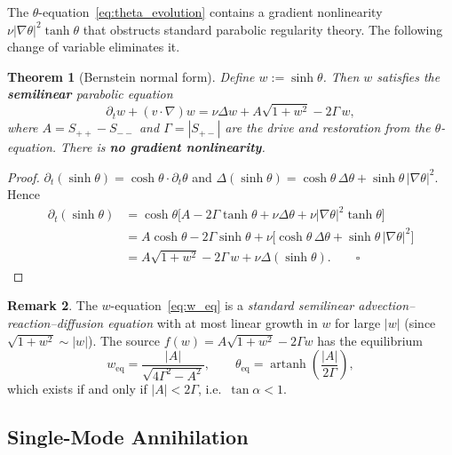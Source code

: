 \documentclass[12pt,a4paper]{article}
\newtheorem{theorem}{Theorem}[section]
\theoremstyle{definition}
\newtheorem{remark}[theorem]{Remark}
\newcommand{\artanh}{\operatorname{artanh}}
\begin{document}
The $\theta$-equation~\eqref{eq:theta_evolution} contains a gradient
nonlinearity $\nu|\nabla\theta|^2\tanh\theta$ that obstructs standard
parabolic regularity theory. The following change of variable eliminates it.

\begin{theorem}[Bernstein normal form]\label{thm:bernstein}
Define $w:=\sinh\theta$. Then $w$ satisfies the \textbf{semilinear}
parabolic equation
\begin{equation}\label{eq:w_eq}
\boxed{\partial_t w + (v\cdot\nabla)w = \nu\Delta w
  + A\sqrt{1+w^2} - 2\Gamma\,w,}
\end{equation}
where $A=S_{++}-S_{--}$ and $\Gamma=|S_{+-}|$ are the drive and
restoration from the $\theta$-equation. There is \textbf{no gradient
nonlinearity}.
\end{theorem}

\begin{proof}
$\partial_t(\sinh\theta)=\cosh\theta\cdot\partial_t\theta$ and
$\Delta(\sinh\theta)=\cosh\theta\,\Delta\theta+\sinh\theta\,|\nabla\theta|^2$.
Hence
\begin{align*}
\partial_t(\sinh\theta)
&=\cosh\theta\bigl[A-2\Gamma\tanh\theta+\nu\Delta\theta
  +\nu|\nabla\theta|^2\tanh\theta\bigr]\\
&=A\cosh\theta-2\Gamma\sinh\theta
  +\nu\bigl[\cosh\theta\,\Delta\theta+\sinh\theta\,|\nabla\theta|^2\bigr]\\
&=A\sqrt{1+w^2}-2\Gamma\,w+\nu\Delta(\sinh\theta).\qquad\square
\end{align*}
\end{proof}

\begin{remark}
The $w$-equation~\eqref{eq:w_eq} is a \emph{standard semilinear
advection--reaction--diffusion equation} with at most linear growth
in $w$ for large $|w|$ (since $\sqrt{1+w^2}\sim|w|$).
The source $f(w)=A\sqrt{1+w^2}-2\Gamma w$ has the equilibrium
\begin{equation}
w_{\mathrm{eq}}=\frac{|A|}{\sqrt{4\Gamma^2-A^2}},\qquad
\theta_{\mathrm{eq}}=\artanh\!\left(\frac{|A|}{2\Gamma}\right),
\end{equation}
which exists if and only if $|A|<2\Gamma$, i.e.\ $\tan\alpha<1$.
\end{remark}

\subsection{Single-Mode Annihilation}
\end{document}
